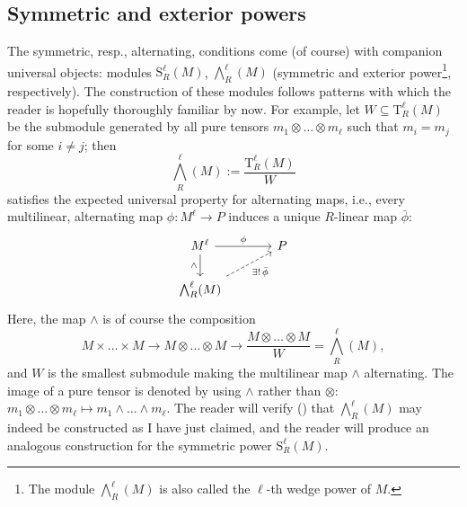 \subsection{Symmetric and exterior powers}
\label{subsec:linrep:symmetric-and-exterior-powers}
The symmetric, resp., alternating, conditions come (of course) with
companion universal objects: modules $\mathrm{S}^\ell_R(M)$,
$\bigwedge^\ell_R(M)$ (symmetric and exterior power\footnote{The
  module $\bigwedge^\ell_R(M)$ is also called the $\ell$-th wedge
  power of $M$.}, respectively). The construction of these modules
follows patterns with which the reader is hopefully thoroughly
familiar by now.  For example, let $W \subseteq \mathrm{T}^\ell_R(M)$
be the submodule generated by all pure tensors
$m_1 \otimes \dots \otimes m_\ell$ such that $m_i = m_j$ for some
$i \neq j$; then
\[
  \bigwedge^\ell_R(M) := \frac{\mathrm{T}^\ell_R(M)}{W}
\]
satisfies the expected universal property for alternating maps, i.e.,
every multilinear, alternating map $\phi : M^\ell \to P$ induces a
unique $R$-linear map $\bar\phi$:
\[
  \begin{tikzcd}[column sep=large]
    M^\ell \ar[r, "\phi"] \ar[d, "\wedge"'] & P \\
    \bigwedge^\ell_R(M) \ar[ur, dashed, "\exists!\,\bar\phi"']
  \end{tikzcd}
\]
Here, the map $\wedge$ is of course the composition
\[
  M \times \dots \times M \to M \otimes \dots \otimes M \to \frac{M
    \otimes \dots \otimes M}{W} = \bigwedge^\ell_R(M),
\]
and $W$ is the smallest submodule making the multilinear map $\wedge$
alternating. The image of a pure tensor is denoted by using $\wedge$
rather than $\otimes$:
$m_1 \otimes \dots \otimes m_\ell \mapsto m_1 \wedge \dots \wedge
m_\ell$.  The reader will verify
() that
$\bigwedge^\ell_R(M)$ may indeed be constructed as I have just
claimed, and the reader will produce an analogous construction for the
symmetric power $\mathrm{S}^\ell_R(M)$.


